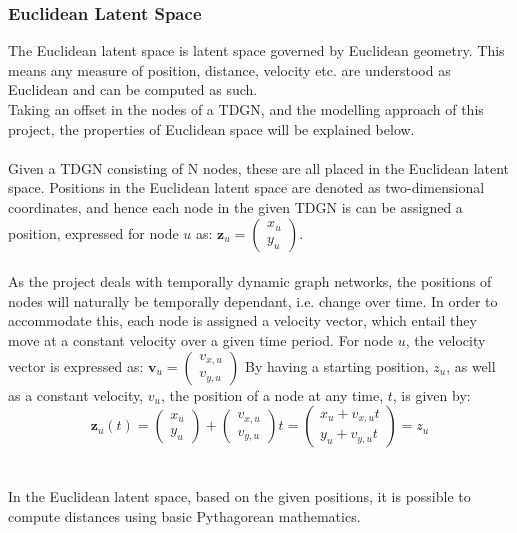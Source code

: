\subsubsection{Euclidean Latent Space}
\label{sec:Method:LSM:EuclideanLatentSpace}
The Euclidean latent space is latent space governed by Euclidean geometry.
This means any measure of position, distance, velocity etc. are understood as Euclidean and can be computed as such. 
\\
Taking an offset in the nodes of a TDGN, and the modelling approach of this project, the properties of Euclidean space will be explained below.
\\\\
Given a TDGN consisting of N nodes, these are all placed in the Euclidean latent space. 
Positions in the Euclidean latent space are denoted as two-dimensional coordinates, and hence each node in the given TDGN is can be assigned a position, expressed for node $u$ as:
$\textbf{z}_u = \begin{pmatrix}
x_u\\
y_u
\end{pmatrix}$.
\\\\
As the project deals with temporally dynamic graph networks, the positions of nodes will naturally be temporally dependant, i.e. change over time. 
In order to accommodate this, each node is assigned a velocity vector, which entail they move at a constant velocity over a given time period.
For node $u$, the velocity vector is expressed as:
$\textbf{v}_u = \begin{pmatrix}
v_{x,u}\\
v_{y,u}
\end{pmatrix}$
By having a starting position, $z_u$, as well as a constant velocity, $v_u$, the position of a node at any time, $t$, is given by: 
$$\textbf{z}_u(t) = \begin{pmatrix}
x_u\\
y_u
\end{pmatrix}
+
\begin{pmatrix}
v_{x,u}\\
v_{y,u}
\end{pmatrix}
t
= 
\begin{pmatrix}
x_u + v_{x,u}t\\
y_u + v_{y,u}t
\end{pmatrix}
=
z_u
$$
\\\\
In the Euclidean latent space, based on the given positions, it is possible to compute distances using basic Pythagorean mathematics. 
